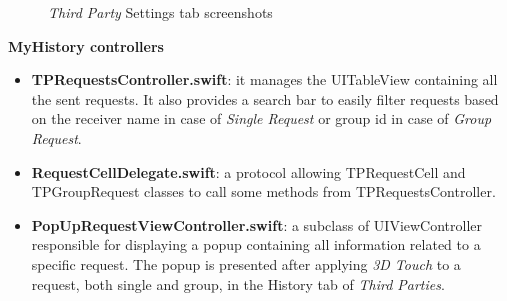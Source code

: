 \documentclass[titlepage]{article}
\begin{document}
{\begin{itemize}
		\end{itemize}
		
		\begin{figure}[H]%
			\centering
			\qquad
			\caption{{\it Third Party} Settings tab screenshots}%
			\label{fig:RequestTab}%
		\end{figure}
		
		{\bf MyHistory controllers}
		\begin{itemize}
			\item {\bf TPRequestsController.swift}: it manages the UITableView containing all the sent requests. It also provides a search bar to easily filter requests based on the receiver name in case of {\it Single Request} or group id in case of {\it Group Request}.
			\item {\bf RequestCellDelegate.swift}: a protocol allowing TPRequestCell and TPGroupRequest classes to call some methods from TPRequestsController.
			\item {\bf PopUpRequestViewController.swift}: a subclass of UIViewController responsible for displaying a popup containing all information related to a specific request. The popup is presented after applying {\it 3D Touch} to a request, both single and group, in the History tab of {\it {\it Third Parties}}.
			

\end{itemize}}
\end{document}
